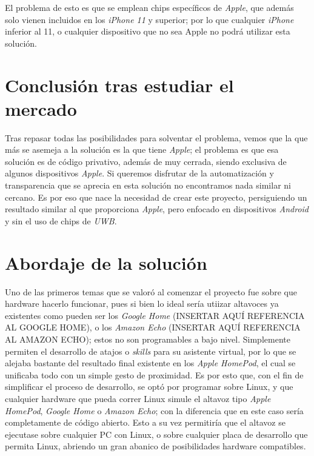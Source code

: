 El problema de esto es que se emplean chips específicos de \emph{Apple}, que
además solo vienen incluidos en los \emph{iPhone 11} y superior; por lo que
cualquier \emph{iPhone} inferior al 11, o cualquier dispositivo que no sea Apple
no podrá utilizar esta solución.

\section{Conclusión tras estudiar el mercado}
Tras repasar todas las posibilidades para solventar el problema, vemos que la
que más se asemeja a la solución es la que tiene \emph{Apple}; el problema es
que esa solución es de código privativo, además de muy cerrada, siendo exclusiva
de algunos dispositivos \emph{Apple}. Si queremos disfrutar de la automatización
y transparencia que se aprecia en esta solución no encontramos nada similar ni
cercano. Es por eso que nace la necesidad de crear este proyecto, persiguiendo
un resultado similar al que proporciona \emph{Apple}, pero enfocado en
dispositivos \emph{Android} y sin el uso de chips de \emph{UWB}.\\

\section{Abordaje de la solución}

Uno de las primeros temas que se valoró al comenzar el proyecto fue sobre que
hardware hacerlo funcionar, pues si bien lo ideal sería utiizar altavoces ya
existentes como pueden ser los \emph{Google Home} (INSERTAR AQUÍ REFERENCIA AL
GOOGLE HOME), o los \emph{Amazon Echo} (INSERTAR AQUÍ REFERENCIA AL AMAZON
ECHO); estos no son programables a bajo nivel. Simplemente permiten el
desarrollo de atajos o \emph{skills} para su asistente virtual, por lo que se
alejaba bastante del resultado final existente en los \emph{Apple HomePod}, el
cual se unificaba todo con un simple gesto de proximidad. Es por esto que, con
el fin de simplificar el proceso de desarrollo, se optó por programar sobre
Linux, y que cualquier hardware que pueda correr Linux simule el altavoz tipo
\emph{Apple HomePod}, \emph{Google Home} o \emph{Amazon Echo}; con la diferencia
que en este caso sería completamente de código abierto. Esto a su vez permitiría
que el altavoz se ejecutase sobre cualquier PC con Linux, o sobre cualquier
placa de desarrollo que permita Linux, abriendo un gran abanico de posibilidades
hardware compatibles. 

